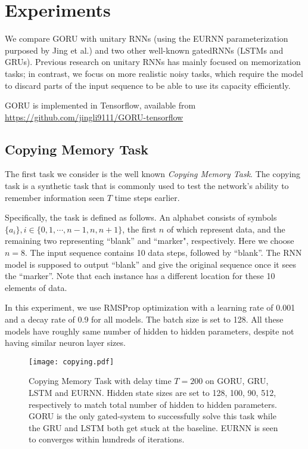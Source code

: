 \documentclass[letterpaper]{article} \usepackage{aaai18}  \usepackage{times}  \usepackage{helvet}  \usepackage{courier}  \usepackage{url}  \usepackage{graphicx}
\begin{document}
\section{Experiments}
We compare GORU with unitary RNNs (using the EURNN parameterization purposed by Jing et al.\cite{jing2016tunable}) and two other well-known gatedRNNs (LSTMs and GRUs). Previous research on unitary RNNs has mainly focused on memorization tasks; in contrast, we focus on more realistic noisy tasks, which require the model to discard parts of the input sequence to be able to use its capacity efficiently. 

GORU is implemented in Tensorflow, available from \url{https://github.com/jingli9111/GORU-tensorflow} 

\subsection{Copying Memory Task}

The first task we consider is the well known {\it Copying Memory Task}. The copying task is a synthetic task that is commonly used to test the network's ability to remember information seen $T$ time steps earlier. 

Specifically, the task is defined as follows.
An alphabet consists of symbols  $\{a_i\}, i \in \{0, 1, \cdots, n-1, n, n+1\}$, the first $n$ of which represent data, and the remaining two representing ``blank'' and ``marker", respectively. Here we choose $n=8$.
The input sequence contains 10 data steps, followed by ``blank''. The RNN model is supposed to output ``blank'' and give the original sequence once it sees the ``marker''. Note that each instance has a different location for these 10 elements of data.

In this experiment, we use RMSProp optimization with a learning rate of 0.001 and a decay rate of 0.9 for all models. The batch size is set to 128. All these models have roughly same number of hidden to hidden parameters, despite not having similar neuron layer sizes.
\begin{figure}[h!]
\centering
\texttt{[image: copying.pdf]}
\caption{Copying Memory Task with delay time $T=200$ on GORU, GRU, LSTM and EURNN. Hidden state sizes are set to 128, 100, 90, 512, respectively to match total number of hidden to hidden parameters. GORU is the only gated-system to successfully solve this task while the GRU and LSTM both get stuck at the baseline. EURNN is seen to converges within hundreds of iterations. }
\label{fig:copying}
\end{figure}
\end{document}
